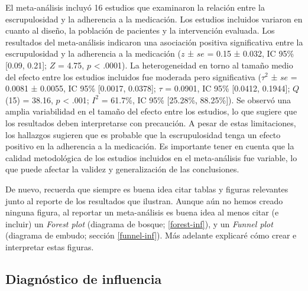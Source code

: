 \documentclass[
  bookmarksnumbered]{article}
\begin{document}
\begin{tcolorbox}[enhanced,attach boxed title to top center={yshift=-3mm,yshifttext=-1mm},
  colback=iacol!5!white,colframe=iacol!75!white,colbacktitle=iacol,
  title=Ejemplo de reporte con intervalos de confianza para heterogeneidad,fonttitle=\bfseries,
  boxed title style={size=small,colframe=iacol} ]
  
El meta-análisis incluyó 16 estudios que examinaron la relación entre la escrupulosidad y la adherencia a la medicación. Los estudios incluidos variaron en cuanto al diseño, la población de pacientes y la intervención evaluada. Los resultados del meta-análisis indicaron una asociación positiva significativa entre la escrupulosidad y la adherencia a la medicación ($z$ ± $se$ = 0.15 ± 0.032, IC 95\% [0.09, 0.21]; $Z$ = 4.75, $p$ < .0001). La heterogeneidad en torno al tamaño medio del efecto entre los estudios incluidos fue moderada pero significativa ($\tau^2$ ± $se$ =  0.0081 ± 0.0055, IC 95\% [0.0017, 0.0378]; $\tau$ = 0.0901, IC 95\% [0.0412, 0.1944]; $Q$(15) =  38.16, $p$ < .001; $I^2$ = 61.7\%, IC 95\% [25.28\%, 88.25\%]). Se observó una amplia variabilidad en el tamaño del efecto entre los estudios, lo que sugiere que los resultados deben interpretarse con precaución. A pesar de estas limitaciones, los hallazgos sugieren que es probable que la escrupulosidad tenga un efecto positivo en la adherencia a la medicación. Es importante tener en cuenta que la calidad metodológica de los estudios incluidos en el meta-análisis fue variable, lo que puede afectar la validez y generalización de las conclusiones.

\end{tcolorbox}

De nuevo, recuerda que siempre es buena idea citar tablas y figuras relevantes junto al reporte de los resultados que ilustran. Aunque aún no hemos creado ninguna figura, al reportar un meta-análisis es buena idea al menos citar (e incluir) un \emph{Forest plot} (diagrama de bosque; \ref{forest-inf}), y un \emph{Funnel plot} (diagrama de embudo; sección \ref{funnel-inf}). Más adelante explicaré cómo crear e interpretar estas figuras.

\hypertarget{diag-inf}{%
\subsection{Diagnóstico de influencia}\label{diag-inf}}
\end{document}
